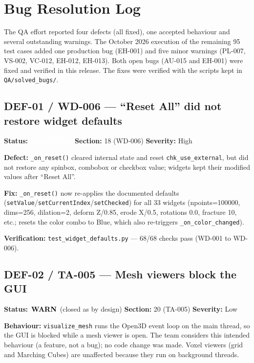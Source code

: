 \documentclass[12pt,a4paper]{article}
\newcommand{\statuswarn}{\colorbox{statusyellow}{\textcolor{black}{\textbf{\,WARN\,}}}}
\newcommand{\statusresolved}{\colorbox{statusorange}{\textcolor{white}{\textbf{\,RESOLVED\,}}}}
\begin{document}
\newpage

\section{Bug Resolution Log}
\label{app:buglog}

The QA effort reported four defects (all fixed), one accepted behaviour and
several outstanding warnings. The October 2026 execution of the remaining 95
test cases added one production bug (EH-001) and five minor warnings (PL-007,
VS-002, VC-012, EH-012, EH-013). Both open bugs (AU-015 and EH-001) were fixed
and verified in this release. The fixes were verified with the scripts kept in
\texttt{QA/solved\_bugs/}.

\subsection{DEF-01 / WD-006 --- ``Reset All'' did not restore widget defaults}
\textbf{Status:} \statusresolved \quad \textbf{Section:} 18 (WD-006) \quad
\textbf{Severity:} High

\textbf{Defect:} \texttt{\_on\_reset()} cleared internal state and reset
\texttt{chk\_use\_external}, but did not restore any spinbox, combobox or
checkbox value; widgets kept their modified values after ``Reset All''.

\textbf{Fix:} \texttt{\_on\_reset()} now re-applies the documented defaults
(\texttt{setValue}/\texttt{setCurrentIndex}/\texttt{setChecked}) for all 33
widgets (npoints=100000, dims=256, dilation=2, deform Z/0.85, erode X/0.5,
rotations 0.0, fracture 10, etc.; resets the color combo to Blue, which also
re-triggers \texttt{\_on\_color\_changed}).

\textbf{Verification:} \texttt{test\_widget\_defaults.py} --- 68/68 checks pass
(WD-001 to WD-006).

\subsection{DEF-02 / TA-005 --- Mesh viewers block the GUI}
\textbf{Status:} \statuswarn{} (closed as by design) \quad \textbf{Section:} 20
(TA-005) \quad \textbf{Severity:} Low

\textbf{Behaviour:} \texttt{visualize\_mesh} runs the Open3D event loop on the
main thread, so the GUI is blocked while a mesh viewer is open. The team
considers this intended behaviour (a feature, not a bug); no code change was
made. Voxel viewers (grid and Marching Cubes) are unaffected because they run on
background threads.
\end{document}

